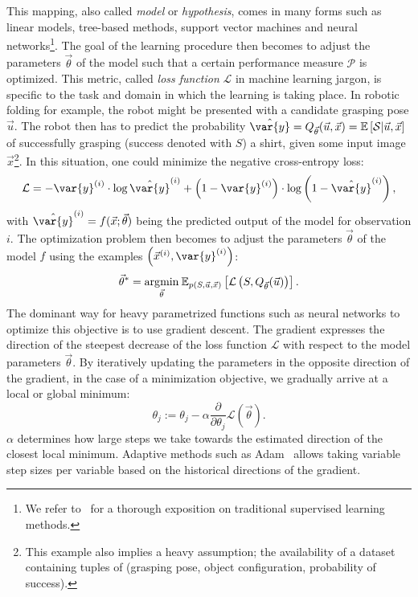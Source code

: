 \documentclass[\home/main.tex]{subfiles}
\begin{document}
This mapping, also called \textit{model} or \textit{hypothesis}, comes in many forms such as linear models, tree-based methods, support vector machines and neural networks\footnote{We refer to~\textcite{Murphy2012, Bishop2006, Hastie2001} for a thorough exposition on traditional supervised learning methods.}.
The goal of the learning procedure then becomes to adjust the parameters $\vec{\theta}$ of the model such that a certain performance measure $\mathcal{P}$ is optimized. This metric, called \textit{loss function} $\mathcal{L}$ in machine learning jargon, is specific to the task and domain in which the learning is taking place. In robotic folding for example, the robot might be presented with a candidate grasping pose $\vec{u}$. The robot then has to predict the probability $\hat{\var{y}} = Q_{\vec{\theta}}(\vec{u}, \vec{x}) = \mathbb{E}\left[ \mathcal{S} | \vec{u}, \vec{x} \right]$ of successfully grasping (success denoted with $S$) a shirt, given some input image $\vec{x}$\footnote{This example also implies a heavy assumption; the availability of a dataset containing tuples of (grasping pose, object configuration, probability of success).}.
In this situation, one could minimize the negative cross-entropy loss:
\begin{equation*}
	\mathcal{L}=-\var{y}^{(i)} \cdot \log \hat{\var{y}}^{(i)} +\left(1-\var{y}^{(i)}\right) \cdot \log \left(1-\hat{\var{y}}^{(i)}\right),
\end{equation*} with $\hat{\var{y}}^{(i)} = f(\vec{x};\vec{\theta})$ being the predicted output of the model for observation $i$.
The optimization problem then becomes to adjust the parameters $\vec{\theta}$ of the model $f$ using the examples $\left(\vec{x}^{(i)}, \var{y}^{(i)}\right)$:
\begin{equation*}
	\vec{\theta}^{*}=\underset{\vec{\theta}}{\operatorname*{\arg\!\min}} \: \mathbb{E}_{p(S, \vec{u}, \vec{x})}\left[\mathcal{L}\left(S, Q_{\vec{\theta}}(\vec{u})\right)\right].
\end{equation*}
The dominant way for heavy parametrized functions such as neural networks to optimize this objective is to use gradient descent. The gradient expresses the direction of the steepest decrease of the loss function $\mathcal{L}$ with respect to the model parameters $\vec{\theta}$. By iteratively updating the parameters in the opposite direction of the gradient, in the case of a minimization objective, we gradually arrive at a local or global minimum:
\begin{equation*}
	\theta_{j}:=\theta_{j}-\alpha \frac{\partial}{\partial \theta_{j}} \mathcal{L}(\vec{\theta}).
\end{equation*}
$\alpha$ determines how large steps we take towards the estimated direction of the closest local minimum. Adaptive methods such as Adam~\autocite{Kingma2014} allows taking variable step sizes per variable based on the historical directions of the gradient.
\end{document}
